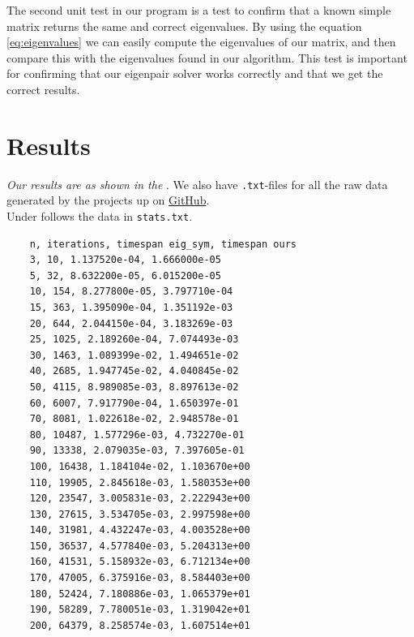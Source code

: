 \documentclass{article}
\begin{document}
The second unit test in our program is a test to confirm that a known simple matrix returns the same and correct eigenvalues. By using the equation \ref{eq:eigenvalues} we can easily compute the eigenvalues of our matrix, and then compare this with the eigenvalues found in our algorithm. This test is important for confirming that our eigenpair solver works correctly and that we get the correct results. \\


\vspace{1cm}

\section{Results} \label{sec:Results}

  \textit{Our results are as shown in the }. We also have \texttt{.txt}-files for all the raw data generated by the projects up on \href{https://github.com/Erikbgram/Fys3150}{GitHub}. \\

  Under follows the data in \texttt{stats.txt}.

  \begin{verbatim}
    n, iterations, timespan eig_sym, timespan ours
    3, 10, 1.137520e-04, 1.666000e-05
    5, 32, 8.632200e-05, 6.015200e-05
    10, 154, 8.277800e-05, 3.797710e-04
    15, 363, 1.395090e-04, 1.351192e-03
    20, 644, 2.044150e-04, 3.183269e-03
    25, 1025, 2.189260e-04, 7.074493e-03
    30, 1463, 1.089399e-02, 1.494651e-02
    40, 2685, 1.947745e-02, 4.040845e-02
    50, 4115, 8.989085e-03, 8.897613e-02
    60, 6007, 7.917790e-04, 1.650397e-01
    70, 8081, 1.022618e-02, 2.948578e-01
    80, 10487, 1.577296e-03, 4.732270e-01
    90, 13338, 2.079035e-03, 7.397605e-01
    100, 16438, 1.184104e-02, 1.103670e+00
    110, 19905, 2.845618e-03, 1.580353e+00
    120, 23547, 3.005831e-03, 2.222943e+00
    130, 27615, 3.534705e-03, 2.997598e+00
    140, 31981, 4.432247e-03, 4.003528e+00
    150, 36537, 4.577840e-03, 5.204313e+00
    160, 41531, 5.158932e-03, 6.712134e+00
    170, 47005, 6.375916e-03, 8.584403e+00
    180, 52424, 7.180886e-03, 1.065379e+01
    190, 58289, 7.780051e-03, 1.319042e+01
    200, 64379, 8.258574e-03, 1.607514e+01
  \end{verbatim}

\end{document}
